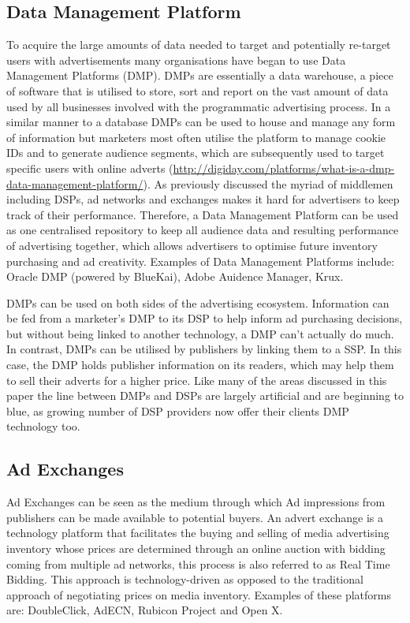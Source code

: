 \documentclass{article}
\begin{document}
\subsection{Data Management Platform}
To acquire the large amounts of data needed to target and potentially re-target users with advertisements many organisations have began to use Data Management Platforms (DMP). DMPs are essentially a data warehouse, a piece of software that is utilised to store, sort and report on the vast amount of data used by all businesses involved with the programmatic advertising process. In a similar manner to a database DMPs can be used to house and manage any form of information but marketers most often utilise the platform to manage cookie IDs and to generate audience segments, which are subsequently used to target specific users with online adverts (\url{http://digiday.com/platforms/what-is-a-dmp-data-management-platform/}). As previously discussed the myriad of middlemen including DSPs, ad networks and exchanges makes it hard for advertisers to keep track of their performance. Therefore, a Data Management Platform can be used as one centralised repository to keep all audience data and resulting performance of advertising together, which allows advertisers to optimise future inventory purchasing and ad creativity. Examples of Data Management Platforms include: Oracle DMP (powered by BlueKai), Adobe Auidence Manager, Krux. \newline

DMPs can be used on both sides of the advertising ecosystem. Information can be fed from a marketer's DMP to its DSP to help inform ad purchasing decisions, but without being linked to another technology, a DMP can't actually do much. In contrast, DMPs can be 
utilised by publishers by linking them to a SSP. In this case, the DMP holds publisher information on its readers, which may help them to sell their adverts for a higher price. Like many of the areas discussed in this paper the line between DMPs and DSPs are largely artificial and are beginning to blue, as growing number of DSP providers now offer their clients DMP technology too.  

\subsection{Ad Exchanges} \label{AdExchanges}
Ad Exchanges can be seen as the medium through which Ad impressions from publishers can be made available to potential buyers. An advert exchange is a technology platform that facilitates the buying and selling of media advertising inventory whose prices are determined through an online auction with bidding coming from multiple ad networks, this process is also referred to as Real Time Bidding. This approach is technology-driven as opposed to the traditional approach of negotiating prices on media inventory.  Examples of these platforms are: DoubleClick, AdECN, Rubicon Project and Open X. \newline
\end{document}
